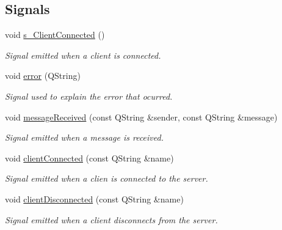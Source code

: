 \subsection*{Signals}
\begin{DoxyCompactItemize}
\item 
void \hyperlink{classBluetoothServer_a743a58193190ac6d05845c0ff7430c8c}{s\+\_\+\+Client\+Connected} ()\hypertarget{classBluetoothServer_a743a58193190ac6d05845c0ff7430c8c}{}\label{classBluetoothServer_a743a58193190ac6d05845c0ff7430c8c}

\begin{DoxyCompactList}\small\item\em Signal emitted when a client is connected. \end{DoxyCompactList}\item 
void \hyperlink{classBluetoothServer_a2083b480c0816480d4835befe663cf1f}{error} (Q\+String)\hypertarget{classBluetoothServer_a2083b480c0816480d4835befe663cf1f}{}\label{classBluetoothServer_a2083b480c0816480d4835befe663cf1f}

\begin{DoxyCompactList}\small\item\em Signal used to explain the error that ocurred. \end{DoxyCompactList}\item 
void \hyperlink{classBluetoothServer_a4133b36b414c0ce886632a93cc29b735}{message\+Received} (const Q\+String \&sender, const Q\+String \&message)
\begin{DoxyCompactList}\small\item\em Signal emitted when a message is received. \end{DoxyCompactList}\item 
void \hyperlink{classBluetoothServer_a18b236c59af04e7439d77a48633350e8}{client\+Connected} (const Q\+String \&name)
\begin{DoxyCompactList}\small\item\em Signal emitted when a clien is connected to the server. \end{DoxyCompactList}\item 
void \hyperlink{classBluetoothServer_a17521320ad9e77537843c7d416e94bef}{client\+Disconnected} (const Q\+String \&name)
\begin{DoxyCompactList}\small\item\em Signal emitted when a client disconnects from the server. \end{DoxyCompactList}\end{DoxyCompactItemize}

